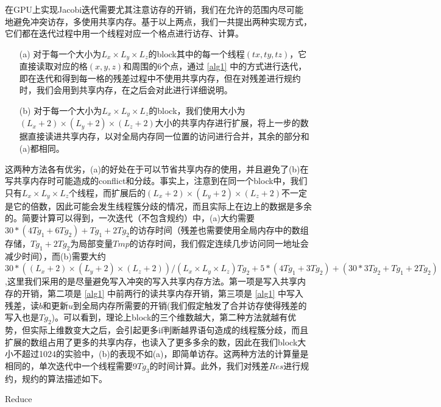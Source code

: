 \documentclass{article}
\begin{document}
在GPU上实现Jacobi迭代需要尤其注意访存的开销，我们在允许的范围内尽可能地避免冲突访存，多使用共享内存。基于以上两点，我们一共提出两种实现方式，它们都在迭代过程中用一个线程对应一个格点进行访存、计算。
\begin{itemize}
\item[(a)]对于每一个大小为$L_x\times L_y\times L_z$的block其中的每一个线程$(tx,ty,tz)$，它直接读取对应的格$(x,y,z)$和周围的6个点，通过 \eqref{alg1} 中的方式进行迭代，即在迭代和得到每一格的残差过程中不使用共享内存，但在对残差进行规约时，我们会用到共享内存，在之后会对此进行详细说明。
\item[(b)]对于每一个大小为$L_x\times L_y\times L_z$的block，我们使用大小为$(L_x+2)\times(L_y+2)\times(L_z+2)$大小的共享内存进行扩展，将上一步的数据直接读进共享内存，以对全局内存同一位置的访问进行合并，其余的部分和(a)都相同。
\end{itemize}
这两种方法各有优劣，(a)的好处在于可以节省共享内存的使用，并且避免了(b)在写共享内存时可能造成的conflict和分歧。事实上，注意到在同一个block中，我们只有$L_x\times L_y\times L_z$个线程，而扩展后的$(L_x+2)\times(L_y+2)\times(L_z+2)$不一定是它的倍数，因此可能会发生线程簇分歧的情况，而且实际上在边上的数据是多余的。简要计算可以得到，一次迭代（不包含规约）中，(a)大约需要$30*(4Tg_1+6Tg_2) + Tg_1+2Tg_2$的访存时间（残差也需要使用全局内存中的数组存储，$Tg_1+2Tg_2$为局部变量$Tmp$的访存时间，我们假定连续几步访问同一地址会减少时间），而(b)需要大约$30*((L_x+2)\times(L_y+2)\times(L_z+2))/(L_x\times L_y\times L_z)Tg_2+5*(4Tg_1+3Tg_2) + (30 * 3Tg_2+ Tg_1+2Tg_2)$,这里我们采用的是尽量避免写入冲突的写入共享内存方法。第一项是写入共享内存的开销，第二项是 \eqref{alg1} 中前两行的读共享内存开销，第三项是 \eqref{alg1} 中写入残差，读$b$和更新$u$到全局内存所需要的开销(我们假定触发了合并访存使得残差的写入也是$Tg_2$)。可以看到，理论上block的三个维数越大，第二种方法就越有优势，但实际上维数变大之后，会引起更多if判断越界语句造成的线程簇分歧，而且扩展的数组占用了更多的共享内存，也读入了更多多余的数，因此在我们block大小不超过1024的实验中，(b)的表现不如(a)，即简单访存。这两种方法的计算量是相同的，单次迭代中一个线程需要$9Tg_3$的时间计算。此外，我们对残差$Res$进行规约，规约的算法描述如下。
\begin{algorithm}[H]
	\caption{Reduce}
	\begin{algorithmic}[1]
		\ENDIF
		\ENDFOR
		\ENDIF
		\ENDIF
	\end{algorithmic}
\end{algorithm}
\end{document}
